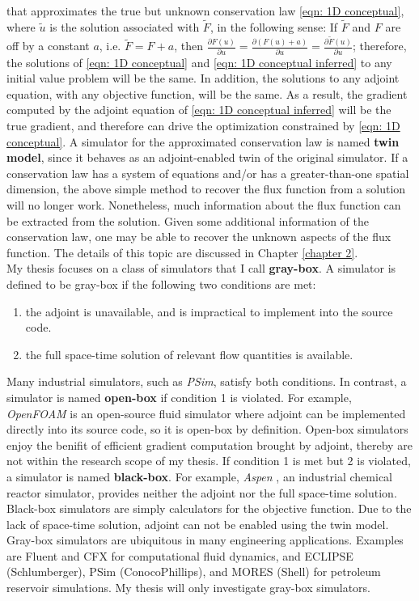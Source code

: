 that approximates the true but unknown conservation law \eqref{eqn: 1D conceptual}, where
$\tilde{u}$ is the solution associated with $\tilde{F}$, in the following sense: If $\tilde{F}$ and $F$ are off by a constant $a$, i.e.
$\tilde{F} = F+a$,
then $\frac{\partial F(u)}{\partial u} = \frac{\partial (F(u)+a)}{\partial u} = \frac{\partial \tilde{F}(u)}{\partial u}$;
therefore, the solutions of \eqref{eqn: 1D conceptual} 
and \eqref{eqn: 1D conceptual inferred}  to any initial value
problem will be the same.
In addition, the solutions to any adjoint equation, with any objective function, will be the same. As a result, the gradient computed 
by the adjoint equation of \eqref{eqn: 1D conceptual inferred} will be the true gradient, and therefore can drive
the optimization constrained by \eqref{eqn: 1D conceptual}.
A simulator for the approximated conservation law is named \textbf{twin model}, since it behaves as an adjoint-enabled
twin of the original simulator.
If a conservation law has a system of equations and/or has a greater-than-one spatial dimension, 
the above simple method to recover the flux function from a solution will no longer work. 
Nonetheless, much information about the flux function can be extracted from the solution. 
Given some additional information of the conservation law, one may be able to recover the unknown aspects of the flux function. 
The details of this topic are discussed in Chapter \ref{chapter 2}.\\

My thesis focuses on a class of simulators that I call \textbf{gray-box}.
A simulator is defined to be gray-box if the following two conditions are met:
\begin{enumerate}
    \item the adjoint is unavailable, and is impractical to implement into the source code.
    \item the full space-time solution of relevant flow quantities is available.
\end{enumerate}
Many industrial simulators, such as \textit{PSim}, satisfy both conditions.
In contrast, a simulator is named \textbf{open-box} if condition 1 is violated.
For example, \textit{OpenFOAM} \cite{openfoam} is an open-source fluid simulator where adjoint can be implemented directly
into its source code, so it is open-box by definition. Open-box simulators enjoy the
benifit of efficient gradient computation brought by adjoint, thereby are not within the research
scope of my thesis. If condition 1 is met but 2 is violated, a simulator
is named \textbf{black-box}. For example, \textit{Aspen} \cite{aspen}, an industrial chemical reactor simulator, provides neither
the adjoint nor the full space-time solution. Black-box simulators are simply calculators
for the objective function. Due to the lack of space-time solution, adjoint can not be enabled
using the twin model. 
Gray-box simulators are ubiquitous in many engineering applications. Examples are Fluent \cite{fluent} and CFX \cite{cfx} for computational fluid
dynamics, and ECLIPSE (Schlumberger), PSim (ConocoPhillips), and MORES (Shell) for petroleum reservoir simulations.
My thesis will only investigate gray-box simulators.\\

